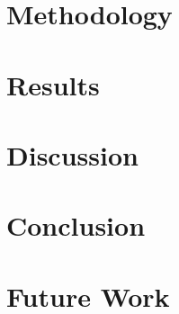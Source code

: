 \documentclass[A4]{scrartcl}
\begin{document}
\section{Methodology}
\label{methodology}


\section{Results}
\label{results}


\section{Discussion}
\label{discussion}


\section{Conclusion}
\label{conclusion}


\section{Future Work}
\label{future-work}



\newpage
\printbibliography
\end{document}
